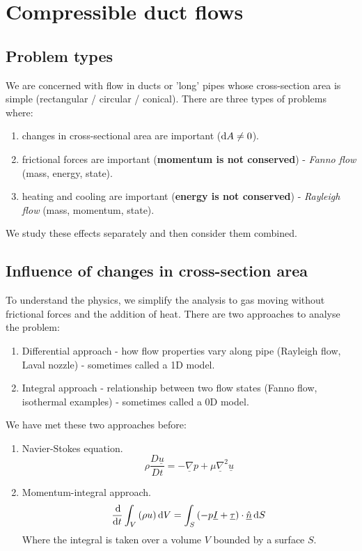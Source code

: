\documentclass[class=report, crop=false, 12pt,a4paper]{standalone}
\begin{document}
\section{Compressible duct flows}
\subsection{Problem types}
We are concerned with flow in ducts or 'long' pipes whose cross-section area is simple (rectangular / circular / conical). There are three types of problems where:
\begin{enumerate}[noitemsep]
    \item changes in cross-sectional area are important ($\dif A \neq 0$).
    \item frictional forces are important (\textbf{momentum is not conserved}) - \textit{Fanno flow} (mass, energy, state).
    \item heating and cooling are important (\textbf{energy is not conserved}) - \textit{Rayleigh flow} (mass, momentum, state).
\end{enumerate}
We study these effects separately and then consider them combined.
\subsection{Influence of changes in cross-section area}
To understand the physics, we simplify the analysis to gas moving without frictional forces and the addition of heat. There are two approaches to analyse the problem:
\begin{enumerate}[noitemsep]
    \item Differential approach - how flow properties vary along pipe (Rayleigh flow, Laval nozzle) - sometimes called a 1D model.
    \item Integral approach - relationship between two flow states (Fanno flow, isothermal examples) - sometimes called a 0D model.
\end{enumerate}
We have met these two approaches before:
\begin{enumerate}
    \item Navier-Stokes equation. $$\rho \dfrac{D\underline{u}}{Dt} = - \underline{\nabla} p + \mu \underline{\nabla}^2 \underline{u}$$
    \item Momentum-integral approach. $$\dfrac{\dif}{\dif t} \int_V \left(\rho u\right)\dif V = \int_S \left(-p\underline{I} + \underline{\tau}\right)\cdot \underline{\hat{n}}\dif S$$ Where the integral is taken over a volume $V$ bounded by a surface $S$.
\end{enumerate}
\end{document}
